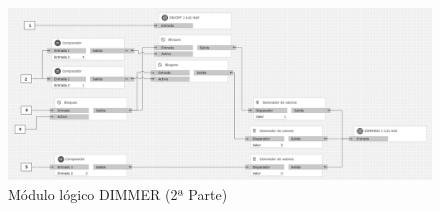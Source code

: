\begin{center}
\begin{figure}[H]
\includegraphics[width=1\textwidth]{figures/log_dimm_der.png}   
\caption{Módulo lógico DIMMER (2ª Parte)}
\label{fig:log_dimm_der}
\end{figure}
\end{center}

